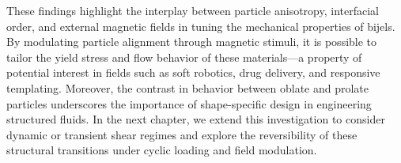 These findings highlight the interplay between particle anisotropy, interfacial order, and external magnetic fields in tuning the mechanical properties of bijels. 
By modulating particle alignment through magnetic stimuli, it is possible to tailor the yield stress and flow behavior of these materials—a property of potential 
interest in fields such as soft robotics, drug delivery, and responsive templating. Moreover, the contrast in behavior between oblate and prolate particles 
underscores the importance of shape-specific design in engineering structured fluids. In the next chapter, we extend this investigation to consider dynamic or 
transient shear regimes and explore the reversibility of these structural transitions under cyclic loading and field modulation.